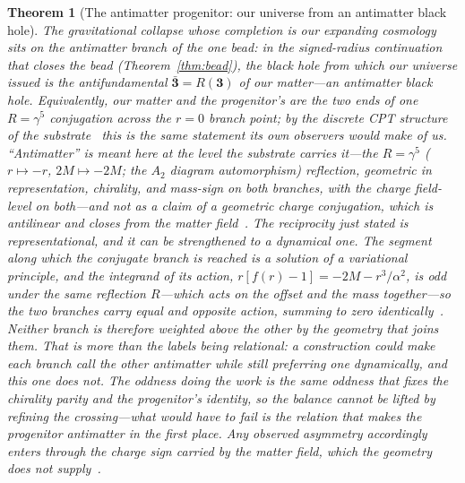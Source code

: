 \documentclass[11pt,a4paper]{article}
\theoremstyle{plain}
\newtheorem{theorem}{Theorem}
\theoremstyle{definition}
\theoremstyle{remark}
\begin{document}
\begin{theorem}[The antimatter progenitor: our universe from an antimatter black hole]\label{thm:antimatter-progenitor}
The gravitational collapse whose completion is our expanding cosmology sits on the antimatter branch of the one bead: in the signed-radius continuation that closes the bead (Theorem~\ref{thm:bead}), the black hole from which our universe issued is the antifundamental $\bar{\mathbf 3}=R(\mathbf 3)$ of our matter---an antimatter black hole. Equivalently, our matter and the progenitor's are the two ends of one $R=\gamma^5$ conjugation across the $r=0$ branch point; by the discrete CPT structure of the substrate~\cite{JanzenBoundary} this is the same statement its own observers would make of us. ``Antimatter'' is meant here at the level the substrate carries it---the $R=\gamma^5$ ($r\mapsto-r$, $2M\mapsto-2M$; the $A_2$ diagram automorphism) reflection, geometric in representation, chirality, and mass-sign on both branches, with the charge field-level on both---and not as a claim of a geometric charge conjugation, which is antilinear and closes from the matter field~\cite{JanzenBoundary}. \emph{The reciprocity just stated is representational, and it can be strengthened to a dynamical one.} The
segment along which the conjugate branch is reached is a solution of a variational principle, and the integrand
of its action, $r[f(r)-1]=-2M-r^{3}/\alpha^{2}$, is \emph{odd} under the same reflection $R$---which acts on the
offset and the mass together---so the two branches carry equal and opposite action, summing to zero
identically~\cite{JanzenCosmogenesis}. \emph{Neither branch is therefore weighted above the other by the
geometry that joins them.} That is more than the labels being relational: a construction could make each branch
call the other antimatter while still preferring one dynamically, and this one does not. \emph{The oddness
doing the work is the same oddness that fixes the chirality parity and the progenitor's identity}, so the
balance cannot be lifted by refining the crossing---what would have to fail is the relation that makes the
progenitor antimatter in the first place. Any observed asymmetry accordingly enters through the charge sign
carried by the matter field, which the geometry does not supply~\cite{JanzenRange}.
\end{theorem}
\end{document}

